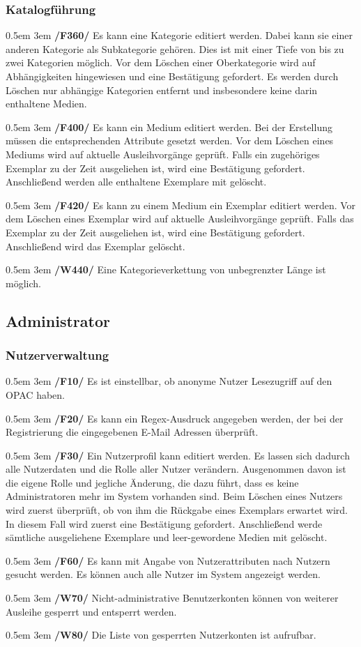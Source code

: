 \documentclass{article}
\newcommand{\specification}[3]{
	{\parindent 0.5em \hangindent 3em \hypertarget{spec:#1:#2}{\textbf{/#1#2/}} #3 \par \nobreak \vspace*{0.5em}}
}
\begin{document}
	\subsubsection{Katalogführung}
		\specification{F}{360}{Es kann eine Kategorie editiert werden. Dabei kann sie einer anderen Kategorie als Subkategorie gehören. Dies ist mit einer Tiefe von bis zu zwei Kategorien möglich. 
			Vor dem Löschen einer Oberkategorie wird auf Abhängigkeiten hingewiesen und eine Bestätigung gefordert. 
			Es werden durch Löschen nur abhängige Kategorien entfernt und insbesondere keine darin enthaltene Medien. }
		\specification{F}{400}{Es kann ein Medium editiert werden. Bei der Erstellung müssen die entsprechenden Attribute gesetzt werden. 
			Vor dem Löschen eines Mediums wird auf aktuelle Ausleihvorgänge geprüft. Falls ein zugehöriges Exemplar zu der Zeit ausgeliehen ist, wird eine Bestätigung gefordert. 
			Anschließend werden alle enthaltene Exemplare mit gelöscht. }
		\specification{F}{420}{Es kann zu einem Medium ein Exemplar editiert werden. Vor dem Löschen eines Exemplar wird auf aktuelle Ausleihvorgänge geprüft.
			Falls das Exemplar zu der Zeit ausgeliehen ist, wird eine Bestätigung gefordert. Anschließend wird das Exemplar gelöscht. }
		\specification{W}{440}{Eine Kategorieverkettung von unbegrenzter Länge ist möglich. }
\subsection{Administrator}
	\subsubsection{Nutzerverwaltung}
		\specification{F}{10}{Es ist einstellbar, ob anonyme Nutzer Lesezugriff auf den OPAC haben. }
		\specification{F}{20}{Es kann ein Regex-Ausdruck angegeben werden, der bei der Registrierung die eingegebenen E-Mail Adressen überprüft. }
		\specification{F}{30}{Ein Nutzerprofil kann editiert werden. Es lassen sich dadurch alle Nutzerdaten und die Rolle aller Nutzer verändern. 
			Ausgenommen davon ist die eigene Rolle und jegliche Änderung, die dazu führt, dass es keine Administratoren mehr im System vorhanden sind. 
			Beim Löschen eines Nutzers wird zuerst überprüft, ob von ihm die Rückgabe eines Exemplars erwartet wird. 
			In diesem Fall wird zuerst eine Bestätigung gefordert. Anschließend werde sämtliche ausgeliehene Exemplare und leer-gewordene Medien mit gelöscht. }
		\specification{F}{60}{Es kann mit Angabe von Nutzerattributen nach Nutzern gesucht werden. Es können auch alle Nutzer im System angezeigt werden. }
		\specification{W}{70}{Nicht-administrative Benutzerkonten können von weiterer Ausleihe gesperrt und entsperrt werden. }
		\specification{W}{80}{Die Liste von gesperrten Nutzerkonten ist aufrufbar. }
\end{document}
